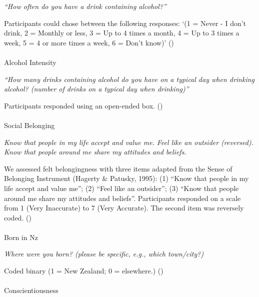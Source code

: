 \documentclass[
  single column]{article}
\makeatletter
\let\oldparagraph\paragraph
\renewcommand{\paragraph}{
    \@ifstar
      \xxxParagraphStar
      \xxxParagraphNoStar
  }
\newcommand{\xxxParagraphStar}[1]{\oldparagraph*{#1}\mbox{}}
\newcommand{\xxxParagraphNoStar}[1]{\oldparagraph{#1}\mbox{}}
\makeatother
\begin{document}
\emph{``How often do you have a drink containing alcohol?''}

Participants could chose between the following responses: `(1 = Never -
I don't drink, 2 = Monthly or less, 3 = Up to 4 times a month, 4 = Up to
3 times a week, 5 = 4 or more times a week, 6 = Don't know)'
()

\paragraph{Alcohol Intensity}\label{alcohol-intensity}

\emph{``How many drinks containing alcohol do you have on a typical day
when drinking alcohol? (number of drinks on a typical day when
drinking)''}

Participants responded using an open-ended box.
()

\paragraph{Social Belonging}\label{social-belonging}

\emph{Know that people in my life accept and value me.} \emph{Feel like
an outsider (reversed).} \emph{Know that people around me share my
attitudes and beliefs.}

We assessed felt belongingness with three items adapted from the Sense
of Belonging Instrument (Hagerty \& Patusky, 1995): (1) ``Know that
people in my life accept and value me''; (2) ``Feel like an outsider'';
(3) ``Know that people around me share my attitudes and beliefs''.
Participants responded on a scale from 1 (Very Inaccurate) to 7 (Very
Accurate). The second item was reversely coded.
()

\paragraph{Born in Nz}\label{born-in-nz}

\emph{Where were you born? (please be specific, e.g., which town/city?)}

Coded binary (1 = New Zealand; 0 = elsewhere.)
()

\paragraph{Conscientiousness}\label{conscientiousness}
\end{document}
